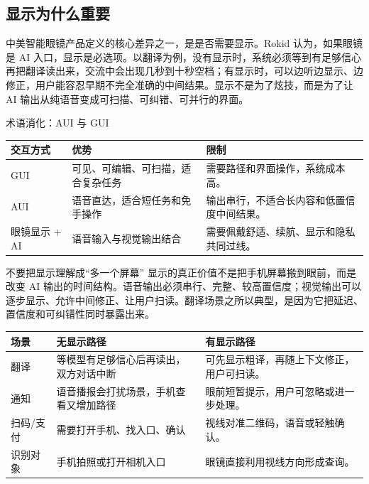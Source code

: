 \documentclass[a4paper]{article}
\begin{document}
\subsection{显示为什么重要}

中美智能眼镜产品定义的核心差异之一，是是否需要显示。Rokid 认为，如果眼镜是 AI 入口，显示是必选项。以翻译为例，没有显示时，系统必须等到有足够信心再把翻译读出来，交流中会出现几秒到十秒空档；有显示时，可以边听边显示、边修正，用户能容忍早期不完全准确的中间结果。显示不是为了炫技，而是为了让 AI 输出从纯语音变成可扫描、可纠错、可并行的界面。

\begin{knowledgebox}{术语消化：AUI 与 GUI}
\noindent\begin{tabularx}{\textwidth}{p{}p{}X}
\toprule
交互方式 & 优势 & 限制 \\
\midrule
GUI & 可见、可编辑、可扫描，适合复杂任务 & 需要路径和界面操作，系统成本高。 \\
AUI & 语音直达，适合短任务和免手操作 & 输出串行，不适合长内容和低置信度中间结果。 \\
眼镜显示 + AI & 语音输入与视觉输出结合 & 需要佩戴舒适、续航、显示和隐私共同过线。 \\
\bottomrule
\end{tabularx}
\end{knowledgebox}

\begin{warningbox}{不要把显示理解成“多一个屏幕”}
显示的真正价值不是把手机屏幕搬到眼前，而是改变 AI 输出的时间结构。语音输出必须串行、完整、较高置信度；视觉输出可以逐步显示、允许中间修正、让用户扫读。翻译场景之所以典型，是因为它把延迟、置信度和可纠错性同时暴露出来。
\end{warningbox}

\noindent\begin{tabularx}{\textwidth}{p{}p{}X}
\toprule
场景 & 无显示路径 & 有显示路径 \\
\midrule
翻译 & 等模型有足够信心后再读出，双方对话中断 & 可先显示粗译，再随上下文修正，用户可扫读。 \\
通知 & 语音播报会打扰场景，手机查看又增加路径 & 眼前短暂提示，用户可忽略或进一步处理。 \\
扫码/支付 & 需要打开手机、找入口、确认 & 视线对准二维码，语音或轻触确认。 \\
识别对象 & 手机拍照或打开相机入口 & 眼镜直接利用视线方向形成查询。 \\
\bottomrule
\end{tabularx}
\end{document}
